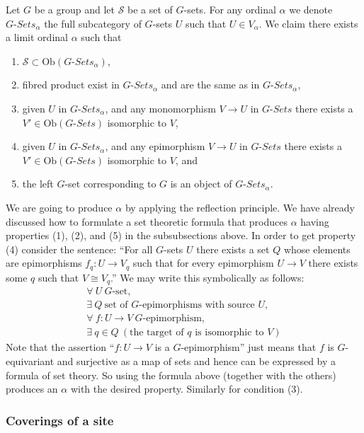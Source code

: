 \noindent
Let $G$ be a group and let $\mathcal{S}$ be a 
set of $G$-sets. For any ordinal $\alpha$ we denote
$G\textit{-Sets}_\alpha$ the full subcategory of $G$-sets
$U$ such that $U \in V_\alpha$. We claim there exists a limit
ordinal $\alpha$ such that
\begin{enumerate}
\item $\mathcal{S} \subset \text{Ob}(G\textit{-Sets}_\alpha)$,
\item fibred product exist in $G\textit{-Sets}_\alpha$
and are the same as in $G\textit{-Sets}_\alpha$,
\item given $U$ in $G\textit{-Sets}_\alpha$, and any monomorphism
$V \to U$ in $G\textit{-Sets}$ there exists a
$V' \in \text{Ob}(G\textit{-Sets})$ isomorphic to $V$,
\item given $U$ in $G\textit{-Sets}_\alpha$, and any epimorphism
$V \to U$ in $G\textit{-Sets}$ there exists a
$V' \in \text{Ob}(G\textit{-Sets})$ isomorphic to $V$, and
\item the left $G$-set corresponding to $G$ is an object of
$G\textit{-Sets}_\alpha$.
\end{enumerate}
We are going to produce $\alpha$ by applying the reflection
principle. We have already discussed how to formulate a set
theoretic formula that produces $\alpha$ having properties
(1), (2), and (5) in the subsubsections above. In order to 
get property (4) consider the sentence: ``For all $G$-sets
$U$ there exists a set $Q$ whose elements are epimorphisms
$f_q : U \to V_q$ such that for every epimorphism $U \to V$
there exists some $q$ such that $V \cong V_q$.'' We may write
this symbolically as follows:
\begin{eqnarray*}
\forall\ U\ \text{$G$-set},\\
\exists\ Q\ \text{set of $G$-epimorphisms with source $U$},\\
\forall\ f : U\to V\ \text{$G$-epimorphism},\\
\exists\ q \in Q\ (\text{the target of $q$ is isomorphic to $V$})
\end{eqnarray*}
Note that the assertion ``$f : U \to V$ is a $G$-epimorphism'' just
means that $f$ is $G$-equivariant and surjective as a map of sets
and hence can be expressed by a formula of set theory. So using
the formula above (together with the others) produces an $\alpha$
with the desired property. Similarly for condition (3).

\subsubsection{Coverings of a site}
\label{subsubsection-coverings-site}

